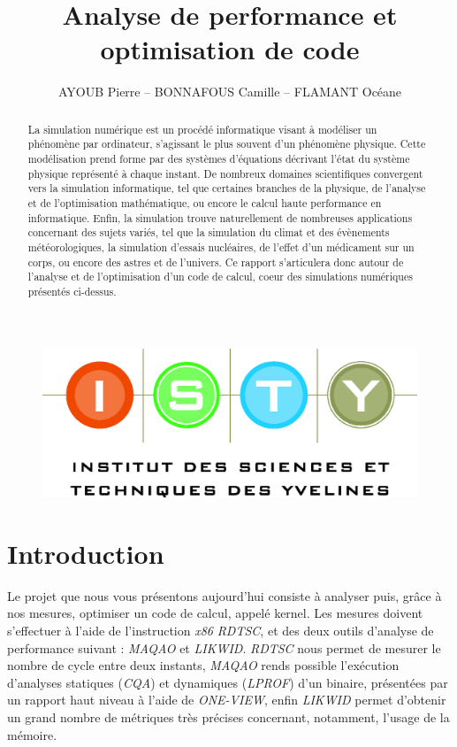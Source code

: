 \documentclass[12pt,a4paper]{article}
\begin{document}
\title{Analyse de performance et optimisation de code}
\author{AYOUB Pierre -- BONNAFOUS Camille -- FLAMANT Océane}

\maketitle

\begin{figure}[b]
    \centering
    \includegraphics[scale=0.3]{figures/isty.jpg}
\end{figure}

\newpage
\begin{abstract}

La simulation numérique est un procédé informatique visant à modéliser un
phénomène par ordinateur, s'agissant le plus souvent d'un phénomène
physique. Cette modélisation prend forme par des systèmes d'équations
décrivant l'état du système physique représenté à chaque instant. De
nombreux domaines scientifiques convergent vers la simulation
informatique, tel que certaines branches de la physique, de l'analyse
et de l'optimisation mathématique, ou encore le calcul haute
performance en informatique. Enfin, la simulation trouve naturellement
de nombreuses applications concernant des sujets variés, tel que la
simulation du climat et des évènements météorologiques, la simulation
d'essais nucléaires, de l'effet d'un médicament sur un corps, ou encore
des astres et de l'univers. Ce rapport s'articulera donc autour de l'analyse et
de l'optimisation d'un code de calcul, coeur des simulations numériques
présentés ci-dessus.

\end{abstract}

\tableofcontents

\section{Introduction}

Le projet que nous vous présentons aujourd'hui consiste à analyser puis, grâce à
nos mesures, optimiser un code de calcul, appelé kernel. Les mesures doivent
s'effectuer à l'aide de l'instruction \textit{x86} \textit{RDTSC}, et des deux
outils d'analyse de performance suivant : \textit{MAQAO} et \textit{LIKWID}.
\textit{RDTSC} nous permet de mesurer le nombre de cycle entre deux instants,
\textit{MAQAO} rends possible l'exécution d'analyses statiques (\textit{CQA}) et
dynamiques (\textit{LPROF}) d'un binaire, présentées par un rapport haut niveau
à l'aide de \textit{ONE-VIEW}, enfin \textit{LIKWID} permet d'obtenir un grand
nombre de métriques très précises concernant, notamment, l'usage de la mémoire.
\end{document}
